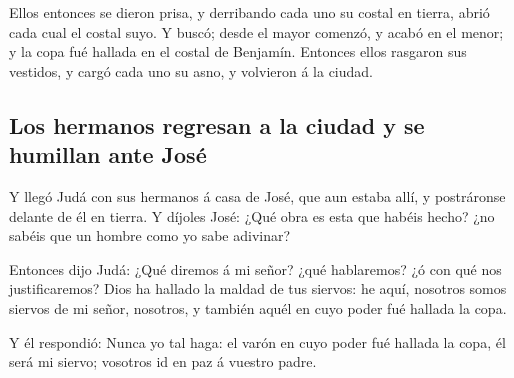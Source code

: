  Ellos entonces se dieron prisa, y derribando cada uno su
costal en tierra, abrió cada cual el costal suyo.  Y
buscó; desde el mayor comenzó, y acabó en el menor; y la copa fué
hallada en el costal de Benjamín.  Entonces ellos
rasgaron sus vestidos, y cargó cada uno su asno, y volvieron á la
ciudad.

\hypertarget{los-hermanos-regresan-a-la-ciudad-y-se-humillan-ante-josuxe9}{%
\subsection{Los hermanos regresan a la ciudad y se humillan ante
José}\label{los-hermanos-regresan-a-la-ciudad-y-se-humillan-ante-josuxe9}}

 Y llegó Judá con sus hermanos á casa de José, que aun
estaba allí, y postráronse delante de él en tierra.  Y
díjoles José: ¿Qué obra es esta que habéis hecho? ¿no sabéis que un
hombre como yo sabe adivinar?

 Entonces dijo Judá: ¿Qué diremos á mi señor? ¿qué
hablaremos? ¿ó con qué nos justificaremos? Dios ha hallado la maldad de
tus siervos: he aquí, nosotros somos siervos de mi señor, nosotros, y
también aquél en cuyo poder fué hallada la copa.

 Y él respondió: Nunca yo tal haga: el varón en cuyo
poder fué hallada la copa, él será mi siervo; vosotros id en paz á
vuestro padre.

